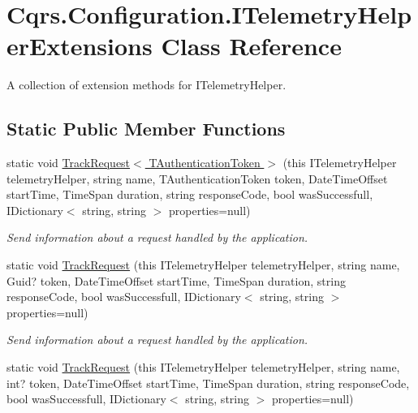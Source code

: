 \hypertarget{classCqrs_1_1Configuration_1_1ITelemetryHelperExtensions}{}\section{Cqrs.\+Configuration.\+I\+Telemetry\+Helper\+Extensions Class Reference}
\label{classCqrs_1_1Configuration_1_1ITelemetryHelperExtensions}


A collection of extension methods for I\+Telemetry\+Helper.  


\subsection*{Static Public Member Functions}
\begin{DoxyCompactItemize}
\item 
static void \hyperlink{classCqrs_1_1Configuration_1_1ITelemetryHelperExtensions_a2e4bf3f56dbd0d10acac587499aca7ba_a2e4bf3f56dbd0d10acac587499aca7ba}{Track\+Request$<$ T\+Authentication\+Token $>$} (this I\+Telemetry\+Helper telemetry\+Helper, string name, T\+Authentication\+Token token, Date\+Time\+Offset start\+Time, Time\+Span duration, string response\+Code, bool was\+Successfull, I\+Dictionary$<$ string, string $>$ properties=null)
\begin{DoxyCompactList}\small\item\em Send information about a request handled by the application. \end{DoxyCompactList}\item 
static void \hyperlink{classCqrs_1_1Configuration_1_1ITelemetryHelperExtensions_a8e248c0990f9abd8f9d7f06a6e82c1d6_a8e248c0990f9abd8f9d7f06a6e82c1d6}{Track\+Request} (this I\+Telemetry\+Helper telemetry\+Helper, string name, Guid? token, Date\+Time\+Offset start\+Time, Time\+Span duration, string response\+Code, bool was\+Successfull, I\+Dictionary$<$ string, string $>$ properties=null)
\begin{DoxyCompactList}\small\item\em Send information about a request handled by the application. \end{DoxyCompactList}\item 
static void \hyperlink{classCqrs_1_1Configuration_1_1ITelemetryHelperExtensions_a4a954213d1a2e3782de2bd4ebe1ec2e9_a4a954213d1a2e3782de2bd4ebe1ec2e9}{Track\+Request} (this I\+Telemetry\+Helper telemetry\+Helper, string name, int? token, Date\+Time\+Offset start\+Time, Time\+Span duration, string response\+Code, bool was\+Successfull, I\+Dictionary$<$ string, string $>$ properties=null)

\end{DoxyCompactItemize}
